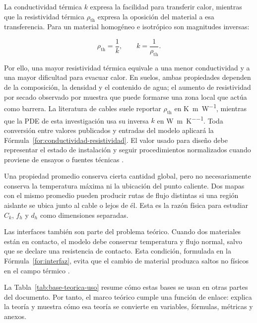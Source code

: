 \documentclass[11pt,a4paper,oneside]{report}
\newcommand{\rhoth}{\rho_{\mathrm{th}}}
\begin{document}
La conductividad térmica $k$ expresa la facilidad para transferir calor, mientras que la resistividad térmica $\rhoth$ expresa la oposición del material a esa transferencia. Para un material homogéneo e isotrópico son magnitudes inversas:

\begin{equation}
\label{for:conductividad-resistividad}
\rhoth=\frac{1}{k},
\qquad
k=\frac{1}{\rhoth}.
\end{equation}

Por ello, una mayor resistividad térmica equivale a una menor conductividad y a una mayor dificultad para evacuar calor. En suelos, ambas propiedades dependen de la composición, la densidad y el contenido de agua; el aumento de resistividad por secado observado por \textcite[1,7]{khumalo2025} muestra que puede formarse una zona local que actúa como barrera. La literatura de cables suele reportar $\rhoth$ en \si{\kelvin\metre\per\watt}, mientras que la PDE de esta investigación usa su inversa $k$ en \si{\watt\per\metre\per\kelvin}. Toda conversión entre valores publicados y entradas del modelo aplicará la Fórmula~\ref{for:conductividad-resistividad}. El valor usado para diseño debe representar el estado de instalación y seguir procedimientos normalizados cuando proviene de ensayos o fuentes técnicas \parencite[secciones 4--6]{ieee442}.

Una propiedad promedio conserva cierta cantidad global, pero no necesariamente conserva la temperatura máxima ni la ubicación del punto caliente. Dos mapas con el mismo promedio pueden producir rutas de flujo distintas si una región aislante se ubica junto al cable o lejos de él. Esta es la razón física para estudiar $C_k$, $f_h$ y $d_h$ como dimensiones separadas.

Las interfaces también son parte del problema teórico. Cuando dos materiales están en contacto, el modelo debe conservar temperatura y flujo normal, salvo que se declare una resistencia de contacto. Esta condición, formulada en la Fórmula~\ref{for:interfaz}, evita que el cambio de material produzca saltos no físicos en el campo térmico \parencites{carslaw1959conduction,kakac2018heatConduction}{patankar1980numerical}[3]{xing2023}.

La Tabla~\ref{tab:base-teorica-uso} resume cómo estas bases se usan en otras partes del documento. Por tanto, el marco teórico cumple una función de enlace: explica la teoría y muestra cómo esa teoría se convierte en variables, fórmulas, métricas y anexos.
\end{document}
